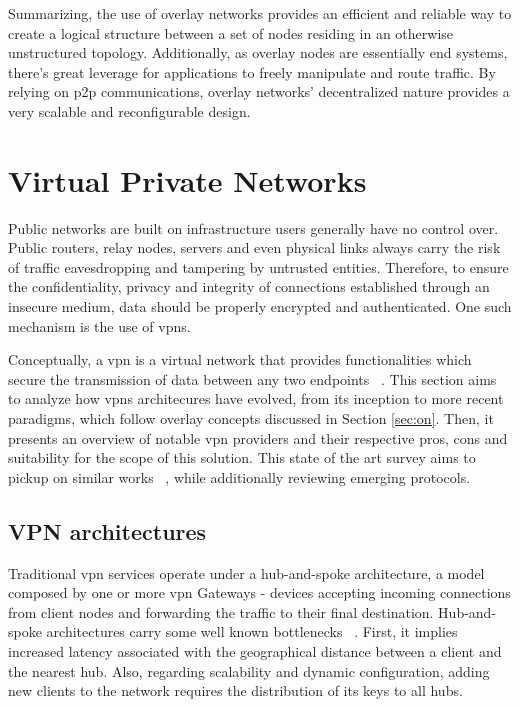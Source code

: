 \documentclass[11pt,twoside,a4paper]{report}
\begin{document}
Summarizing, the use of overlay networks provides an efficient and reliable way to create a logical structure between a set of nodes residing in an otherwise unstructured topology. Additionally, as overlay nodes are essentially end systems, there's great leverage for applications to freely manipulate and route traffic. By relying on \ac{p2p} communications, overlay networks' decentralized nature provides a very scalable and reconfigurable design.

\section{Virtual Private Networks}

Public networks are built on infrastructure users generally have no control over. Public routers, relay nodes, servers and even physical links always carry the risk of traffic eavesdropping and tampering by untrusted entities. Therefore, to ensure the confidentiality, privacy and integrity of connections established through an insecure medium, data should be properly encrypted and authenticated. One such mechanism is the use of \acp{vpn}.

Conceptually, a \ac{vpn} is a virtual network that provides functionalities which secure the transmission of data between any two endpoints ~\cite{HARMENING2017843}. This section aims to analyze how \acp{vpn} architecures have evolved, from its inception to more recent paradigms, which follow overlay concepts discussed in Section \ref{sec:on}. Then, it presents an overview of notable \ac{vpn} providers and their respective pros, cons and suitability for the scope of this solution. This state of the art survey aims to pickup on similar works ~\cite{zuqueteseguranca, berger2006analysis}, while additionally reviewing emerging protocols.

\subsection{VPN architectures}

Traditional \ac{vpn} services operate under a hub-and-spoke architecture, a model composed by one or more \ac{vpn} Gateways - devices accepting incoming connections from client nodes and forwarding the traffic to their final destination. Hub-and-spoke architectures carry some well known bottlenecks ~\cite{ELHEDHLI20051615, o1998geographer}. First, it implies increased latency associated with the geographical distance between a client and the nearest hub. Also, regarding scalability and dynamic configuration, adding new clients to the network requires the distribution of its keys to all hubs.
\end{document}
